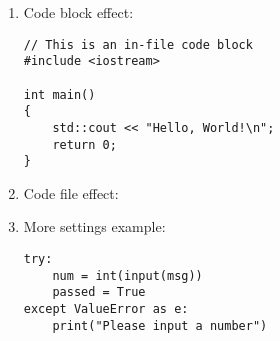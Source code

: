 \documentclass[preview]{standalone}
\begin{document}
\begin{enumerate}
\item Code block effect:
\begin{lstlisting}[style=display-code]
// This is an in-file code block
#include <iostream>

int main()
{
	std::cout << "Hello, World!\n";
	return 0;
}
\end{lstlisting}

\item Code file effect:


\item More settings example:
\begin{lstlisting}[style=more-settings]
try:
	num = int(input(msg))
	passed = True
except ValueError as e:
	print("Please input a number")
\end{lstlisting}
\end{enumerate}
\end{document}
